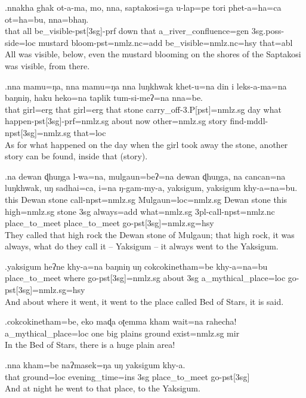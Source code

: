 \exg.nnakha ghak ot-a-ma,   mo, nna,  saptakosi=ga   u-lap=pe  tori phet-a=ha=ca    ot=ha=bu,    nna=bhaŋ.\\
that all  be\_visible{\sc -pst[3sg]-prf} down that a\_river\_confluence{\sc =gen} {\sc 3sg.poss-}side{\sc =loc} mustard bloom{\sc -pst=nmlz.nc=add} be\_visible{\sc =nmlz.nc=hsy} that{\sc =abl}\\
All was visible, below, even the mustard blooming on the shores of the Saptakosi was visible, from there.

\exg.nna  mamu=ŋa, nna  mamu=ŋa nna  luŋkhwak khet-u=na   din i  leks-a-ma=na    baŋniŋ, haku heko=na taplik tum-si-meʔ=na nna=be.\\
that girl{\sc =erg} that girl{\sc =erg} that stone carry\_off{\sc -3.P[pst]=nmlz.sg} day what happen{\sc -pst[3sg]-prf=nmlz.sg} about now  other{\sc =nmlz.sg} story  find{\sc -mddl-npst[3sg]=nmlz.sg} that{\sc =loc}\\
As for what happened on the day when the girl took away the stone, another story can be found, inside that (story).

\exg.na dewan  ɖhuŋga l-wa=na,   mulgaun=beʔ=na dewan  ɖhuŋga, na cancan=na  luŋkhwak, uŋ sadhai=ca, i=na   ŋ-gam-my-a,    yaksigum,  yaksigum  khy-a=na=bu.\\
this Dewan stone  call{\sc -npst=nmlz.sg} Mulgaun{\sc =loc=nmlz.sg} Dewan stone  this high{\sc =nmlz.sg} stone {\sc 3sg} always{\sc =add} what{\sc =nmlz.sg} {\sc 3pl-}call{\sc -npst=nmlz.nc} place\_to\_meet place\_to\_meet go{\sc -pst[3sg]=nmlz.sg=hsy}\\
They called that high rock the Dewan stone of Mulgaun; that high rock, it was always, what do they call it -- Yaksigum -- it always went to the Yaksigum.

\exg.yaksigum  heʔne khy-a=na   baŋniŋ uŋ cokcokinetham=be khy-a=na=bu\\
place\_to\_meet where  go{\sc -pst[3sg]=nmlz.sg} about  {\sc 3sg} a\_mythical\_place{\sc =loc} go{\sc -pst[3sg]=nmlz.sg=hsy}\\
And about where it went, it went to the place called Bed of Stars, it is said.

\exg.cokcokinetham=be, eko maɖa oʈemma kham wait=na  rahecha!\\
a\_mythical\_place{\sc =loc} one big plains  ground exist{\sc [3sg]=nmlz.sg} {\sc mir}\\
In the Bed of Stars, there is a huge plain area!

\exg.nna  kham=be  naʔmasek=ŋa  uŋ yaksigum  khy-a.\\
that ground=loc evening\_time{\sc =ins} {\sc 3sg} place\_to\_meet go{\sc -pst[3sg]}\\
And at night he went to that place, to the Yaksigum.

